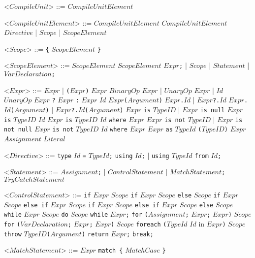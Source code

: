 \documentclass{article}
\newcommand{\gtext}[1]{<$#1$>}
\newcommand{\glit}[1]{\texttt{#1}}
\begin{document}
\begin{grammar}

	\gtext{CompileUnit} ::= $CompileUnitElement$

	\gtext{CompileUnitElement} ::= $CompileUnitElement$ $CompileUnitElement$
	\alt $Directive$ | $Scope$ | $ScopeElement$

	\gtext{Scope} ::= \glit{\{} $ScopeElement$ \glit{\}}
	
	\gtext{ScopeElement} ::= $ScopeElement$ $ScopeElement$
	\alt $Expr$\glit{;} | $Scope$ | $Statement$	| $VarDeclaration$\glit{;}
	
	\gtext{Expr} ::= $Expr$ | \glit{(}$Expr$\glit{)}
	\alt $Expr$ $BinaryOp$ $Expr$ | $UnaryOp$ $Expr$ | $Id$ $UnaryOp$
	\alt $Expr$ \glit{?} $Expr$ \glit{:} $Expr$
	\alt $Id$
	\alt $Expr$\glit{(}$Argument$\glit{)}
	\alt $Expr$\glit{.}$Id$ | $Expr$\glit{?.}$Id$ 
	\alt $Expr$\glit{.}$Id$\glit{(}$Argument$\glit{)} | $Expr$\glit{?.}$Id$\glit{(}$Argument$\glit{)}
	\alt $Expr$ \glit{is} $TypeID$ | $Expr$ \glit{is null} $Expr$ \glit{is} $TypeID$ $Id$
	\alt $Expr$ \glit{is} $TypeID$ $Id$ \glit{where} $Expr$
	\alt $Expr$ \glit{is not} $TypeID$ | $Expr$ \glit{is not null}
	\alt $Expr$ \glit{is not} $TypeID$ $Id$ \glit{where} $Expr$ %
	\alt $Expr$ \glit{as} $TypeId$
	\alt \glit{(}$TypeID$\glit{)} $Expr$
	\alt $Assignment$
	\alt $Literal$

	\gtext{Directive} ::= \glit{type} $Id$ \glit{=} $TypeId$\glit{;}
	\alt \glit{using} $Id$\glit{;} | \glit{using} $TypeId$ \glit{from} $Id$\glit{;}

	\gtext{Statement} ::= $Assignment$\glit{;} | $ControlStatement$ | $MatchStatement$\glit{;}
	\alt $TryCatchStatement$
	
	\gtext{ControlStatement} ::= \glit{if} $Expr$ $Scope$
	\alt \glit{if} $Expr$ $Scope$ \glit{else} $Scope$
	\alt \glit{if} $Expr$ $Scope$ \glit{else if} $Expr$ $Scope$
	\alt \glit{if} $Expr$ $Scope$ \glit{else if} $Expr$ $Scope$ \glit{else} $Scope$
	\alt \glit{while} $Expr$ $Scope$
	\alt \glit{do} $Scope$ \glit{while} $Expr$\glit{;}
	\alt \glit{for} \glit{(}$Assignment$\glit{;} $Expr$\glit{;} $Expr$\glit{)} $Scope$
	\alt \glit{for} \glit{(}$VarDeclaration$\glit{;} $Expr$\glit{;} $Expr$\glit{)} $Scope$
	\alt \glit{foreach} \glit{(}$TypeId$ $Id$ {in} $Expr$\glit{)} $Scope$
	\alt \glit{throw} $TypeID$\glit{(}$Argument$\glit{)}
	\alt \glit{return} $Expr$\glit{;}
	\alt \glit{break;}
	
	\gtext{MatchStatement} ::= $Expr$ \glit{match \{} $MatchCase$ \glit{\}} 
	

\end{grammar}
\end{document}
